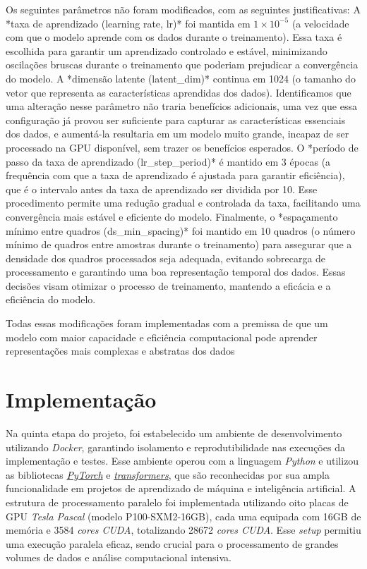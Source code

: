 Os seguintes parâmetros não foram modificados, com as seguintes justificativas: A *taxa de aprendizado (learning rate, lr)* foi mantida em \(1 \times 10^{-5}\) (a velocidade com que o modelo aprende com os dados durante o treinamento). Essa taxa é escolhida para garantir um aprendizado controlado e estável, minimizando oscilações bruscas durante o treinamento que poderiam prejudicar a convergência do modelo. A *dimensão latente (latent\_dim)* continua em 1024 (o tamanho do vetor que representa as características aprendidas dos dados). Identificamos que uma alteração nesse parâmetro não traria benefícios adicionais, uma vez que essa configuração já provou ser suficiente para capturar as características essenciais dos dados, e aumentá-la resultaria em um modelo muito grande, incapaz de ser processado na GPU disponível, sem trazer os benefícios esperados. O *período de passo da taxa de aprendizado (lr\_step\_period)* é mantido em 3 épocas (a frequência com que a taxa de aprendizado é ajustada para garantir eficiência), que é o intervalo antes da taxa de aprendizado ser dividida por 10. Esse procedimento permite uma redução gradual e controlada da taxa, facilitando uma convergência mais estável e eficiente do modelo. Finalmente, o *espaçamento mínimo entre quadros (ds\_min\_spacing)* foi mantido em 10 quadros (o número mínimo de quadros entre amostras durante o treinamento) para assegurar que a densidade dos quadros processados seja adequada, evitando sobrecarga de processamento e garantindo uma boa representação temporal dos dados. Essas decisões visam otimizar o processo de treinamento, mantendo a eficácia e a eficiência do modelo.

Todas essas modificações foram implementadas com a premissa de que um modelo com maior capacidade e eficiência computacional pode aprender representações mais complexas e abstratas dos dados


\section{Implementação} 
\label{sub:Implementação}

Na quinta etapa do projeto, foi estabelecido um ambiente de desenvolvimento utilizando \textit{Docker}, garantindo isolamento e reprodutibilidade nas execuções da implementação e testes. Esse ambiente operou com a linguagem \textit{Python} e utilizou as bibliotecas \href{https://pytorch.org/}{\textit{PyTorch}} e \href{https://huggingface.co/transformers/}{\textit{transformers}}, que são reconhecidas por sua ampla funcionalidade em projetos de aprendizado de máquina e inteligência artificial. A estrutura de processamento paralelo foi implementada utilizando oito placas de GPU \textit{Tesla Pascal} (modelo P100-SXM2-16GB), cada uma equipada com 16GB de memória e 3584 \textit{cores CUDA}, totalizando 28672 \textit{cores CUDA}. Esse \textit{setup} permitiu uma execução paralela eficaz, sendo crucial para o processamento de grandes volumes de dados e análise computacional intensiva.

